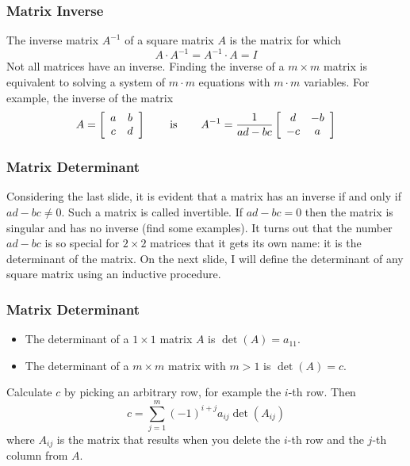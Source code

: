 \documentclass[xcolor=dvipsnames]{beamer}
\begin{document}
\begin{frame}
  \frametitle{Matrix Inverse}
The \alert{inverse matrix} $A^{-1}$ of a square matrix $A$ is the
matrix for which
\begin{equation}
  \label{eq:quoovain}
  A\cdot{}A^{-1}=A^{-1}\cdot{}A=I
\end{equation}
Not all matrices have an inverse. Finding the inverse of a
$m\times{}m$ matrix is equivalent to solving a system of $m\cdot{}m$
equations with $m\cdot{}m$ variables. For example, the inverse of the
matrix
\begin{equation}
  \label{eq:iiphiese}
  A=\left[
    \begin{array}{cc}
      a & b \\
      c & d
    \end{array}\right]\hspace{.25in}\mbox{ is }\hspace{.25in}A^{-1}=\frac{1}{ad-bc}\left[
    \begin{array}{cc}
      d & -b \\
      -c & a
    \end{array}\right]
\end{equation}
\end{frame}

\begin{frame}
  \frametitle{Matrix Determinant}
  Considering the last slide, it is evident that a matrix has an
  inverse if and only if $ad-bc\neq{}0$. Such a matrix is called
  \alert{invertible}. If $ad-bc=0$ then the matrix is \alert{singular}
  and has no inverse (find some examples). It turns out that the
  number $ad-bc$ is so special for $2\times{}2$ matrices that it gets
  its own name: it is the \alert{determinant} of the matrix. On the
  next slide, I will define the determinant of any square matrix using
  an inductive procedure.
\end{frame}

\begin{frame}
  \frametitle{Matrix Determinant}
  \begin{itemize}
  \item The determinant of a $1\times{}1$ matrix $A$ is
    $\det(A)=a_{11}$.
  \item The determinant of a $m\times{}m$ matrix with $m>1$ is
    $\det(A)=c$. 
  \end{itemize}
  Calculate $c$ by picking an arbitrary row, for example the $i$-th
  row. Then
  \begin{equation}
    \label{eq:queiyesh}
    c=\sum_{j=1}^{m}(-1)^{i+j}a_{ij}\det(A_{ij})
  \end{equation}
where $A_{ij}$ is the matrix that results when you delete the $i$-th
row and the $j$-th column from $A$. 
\end{frame}
\end{document}
